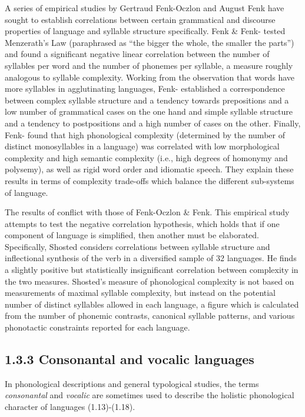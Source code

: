   A series of empirical studies by Gertraud Fenk-Oczlon and August Fenk have sought to establish correlations between certain grammatical and discourse properties of language and syllable structure specifically. Fenk \& Fenk-\citet{Oczlon1993} tested Menzerath’s Law (paraphrased as “the bigger the whole, the smaller the parts”) and found a significant negative linear correlation between the number of syllables per word and the number of phonemes per syllable, a measure roughly analogous to syllable complexity. Working from the observation that words have more syllables in agglutinating languages, Fenk-\citet{OczlonFenk2005} established a correspondence between complex syllable structure and a tendency towards prepositions and a low number of grammatical cases on the one hand and simple syllable structure and a tendency to postpositions and a high number of cases on the other. Finally, Fenk-\citet{OczlonFenk2008} found that high phonological complexity (determined by the number of distinct monosyllables in a language) was correlated with low morphological complexity and high semantic complexity (i.e., high degrees of homonymy and polysemy), as well as rigid word order and idiomatic speech. They explain these results in terms of complexity trade-offs which balance the different sub-systems of language.



  The results of \citet{Shosted2006} conflict with those of Fenk-Oczlon \& Fenk. This empirical study attempts to test the negative correlation hypothesis, which holds that if one component of language is simplified, then another must be elaborated. Specifically, Shosted considers correlations between syllable structure and inflectional synthesis of the verb in a diversified sample of 32 languages. He finds a slightly positive but statistically insignificant correlation between complexity in the two measures. Shosted’s measure of phonological complexity is not based on measurements of maximal syllable complexity, but instead on the potential number of distinct syllables allowed in each language, a figure which is calculated from the number of phonemic contrasts, canonical syllable patterns, and various phonotactic constraints reported for each language.


\subsection{1.3.3 Consonantal and vocalic languages}

  In phonological descriptions and general typological studies, the terms \textit{consonantal} and \textit{vocalic} are sometimes used to describe the holistic phonological character of languages (1.13)-(1.18).



